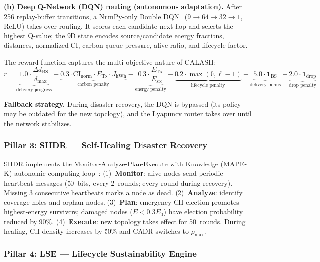 \textbf{(b) Deep Q-Network (DQN) routing (autonomous adaptation).}
After 256 replay-buffer transitions, a NumPy-only Double DQN~\cite{mnih2015dqn, vanhasselt2016ddqn} ($9 \to 64 \to 32 \to 1$, ReLU) takes over routing.
It scores each candidate next-hop and selects the highest Q-value; the 9D state encodes source/candidate energy fractions, distances, normalized CI, carbon queue pressure, alive ratio, and lifecycle factor.

The reward function captures the multi-objective nature of CALASH:
\begin{equation}
    r = \underbrace{1.0 \cdot \frac{\Delta d_{\text{BS}}}{d_{\max}}}_{\text{delivery progress}}
      - \underbrace{0.3 \cdot \text{CI}_{\text{norm}} \cdot E_{\text{Tx}} \cdot J_{\text{kWh}}}_{\text{carbon penalty}}
      - \underbrace{0.3 \cdot \frac{E_{\text{Tx}}}{E_{\text{src}}}}_{\text{energy penalty}}
      - \underbrace{0.2 \cdot \max(0, \ell - 1)}_{\text{lifecycle penalty}}
      + \underbrace{5.0 \cdot \mathbf{1}_{\text{BS}}}_{\text{delivery bonus}}
      - \underbrace{2.0 \cdot \mathbf{1}_{\text{drop}}}_{\text{drop penalty}}
    \label{art2:eq:reward}
\end{equation}

\textbf{Fallback strategy.}
During disaster recovery, the DQN is bypassed (its policy may be outdated for the new topology), and the Lyapunov router takes over until the network stabilizes.

\subsubsection{Pillar 3: SHDR --- Self-Healing Disaster Recovery}
\label{art2:sec:shdr}

SHDR implements the Monitor-Analyze-Plan-Execute with Knowledge (MAPE-K) autonomic computing loop~\cite{kephart2003autonomic}:
(1)~\textbf{Monitor}: alive nodes send periodic heartbeat messages (50~bits, every 2~rounds; every round during recovery). Missing 3 consecutive heartbeats marks a node as dead.
(2)~\textbf{Analyze}: identify coverage holes and orphan nodes.
(3)~\textbf{Plan}: emergency CH election promotes highest-energy survivors; damaged nodes ($E < 0.3 E_0$) have election probability reduced by 90\%.
(4)~\textbf{Execute}: new topology takes effect for 50~rounds.
During healing, CH density increases by 50\% and CADR switches to $\rho_{\max}$.

\subsubsection{Pillar 4: LSE --- Lifecycle Sustainability Engine}
\label{art2:sec:lse}

